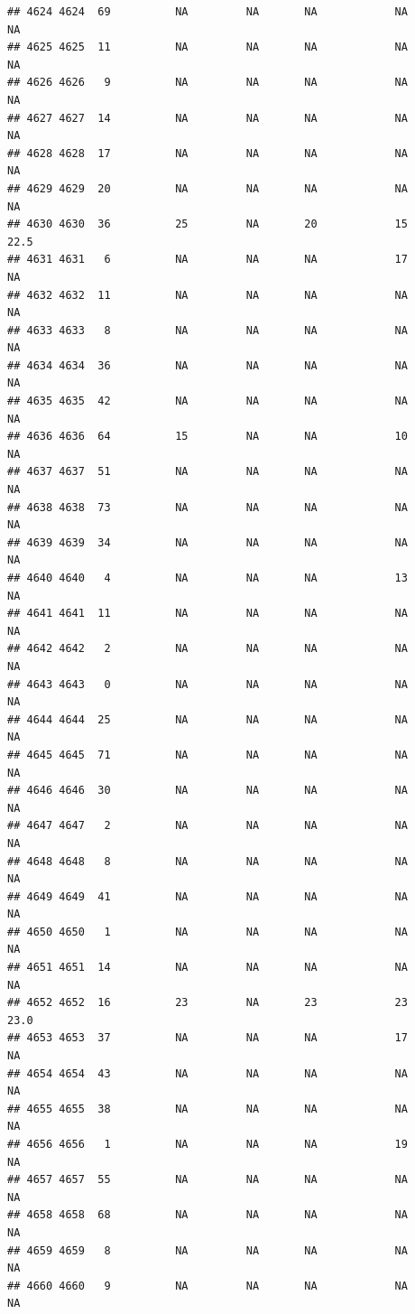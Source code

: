\documentclass[man]{apa6}
\begin{document}
\begin{verbatim}
## 4624 4624  69          NA         NA       NA            NA       NA
## 4625 4625  11          NA         NA       NA            NA       NA
## 4626 4626   9          NA         NA       NA            NA       NA
## 4627 4627  14          NA         NA       NA            NA       NA
## 4628 4628  17          NA         NA       NA            NA       NA
## 4629 4629  20          NA         NA       NA            NA       NA
## 4630 4630  36          25         NA       20            15     22.5
## 4631 4631   6          NA         NA       NA            17       NA
## 4632 4632  11          NA         NA       NA            NA       NA
## 4633 4633   8          NA         NA       NA            NA       NA
## 4634 4634  36          NA         NA       NA            NA       NA
## 4635 4635  42          NA         NA       NA            NA       NA
## 4636 4636  64          15         NA       NA            10       NA
## 4637 4637  51          NA         NA       NA            NA       NA
## 4638 4638  73          NA         NA       NA            NA       NA
## 4639 4639  34          NA         NA       NA            NA       NA
## 4640 4640   4          NA         NA       NA            13       NA
## 4641 4641  11          NA         NA       NA            NA       NA
## 4642 4642   2          NA         NA       NA            NA       NA
## 4643 4643   0          NA         NA       NA            NA       NA
## 4644 4644  25          NA         NA       NA            NA       NA
## 4645 4645  71          NA         NA       NA            NA       NA
## 4646 4646  30          NA         NA       NA            NA       NA
## 4647 4647   2          NA         NA       NA            NA       NA
## 4648 4648   8          NA         NA       NA            NA       NA
## 4649 4649  41          NA         NA       NA            NA       NA
## 4650 4650   1          NA         NA       NA            NA       NA
## 4651 4651  14          NA         NA       NA            NA       NA
## 4652 4652  16          23         NA       23            23     23.0
## 4653 4653  37          NA         NA       NA            17       NA
## 4654 4654  43          NA         NA       NA            NA       NA
## 4655 4655  38          NA         NA       NA            NA       NA
## 4656 4656   1          NA         NA       NA            19       NA
## 4657 4657  55          NA         NA       NA            NA       NA
## 4658 4658  68          NA         NA       NA            NA       NA
## 4659 4659   8          NA         NA       NA            NA       NA
## 4660 4660   9          NA         NA       NA            NA       NA

\end{verbatim}
\end{document}
